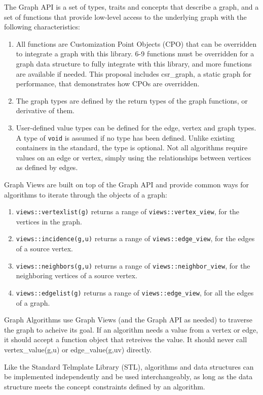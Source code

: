 \documentclass[10pt,onecolumn]{article}
\begin{document}
The Graph API is a set of types, traits and concepts that describe a graph, and a set of functions that provide low-level access to the 
underlying graph with the following characteristics:
\begin{enumerate}
\item All functions are Customization Point Objects (CPO) that can be overridden to integrate a graph with this library. 
6-9 functions must be overridden for a graph data structure to fully integrate with this library, and more functions are available if needed. This proposal includes 
csr\_graph, a static graph for performance, that demonstrates how CPOs are overridden.
\item The graph types are defined by the return types of the graph functions, or derivative of them.
\item User-defined value types can be defined for the edge, vertex and graph types. A type of \texttt{void} is assumed if no type has been defined.
Unlike existing containers in the standard, the type is optional. Not all algorithms require values on an edge or vertex, simply using the relationships
between vertices as defined by edges.
\end{enumerate}

Graph Views are built on top of the Graph API and provide common ways for algorithms to iterate through the objects of a graph:
\begin{enumerate}
\item \texttt{views::vertexlist(g)} returns a range of \texttt{views::vertex\_view}, for the vertices in the graph. 
\item \texttt{views::incidence(g,u)} returns a range of \texttt{views::edge\_view}, for the edges of a source vertex.
\item \texttt{views::neighbors(g,u)} returns a range of \texttt{views::neighbor\_view}, for the neighboring vertices of a source vertex.
\item \texttt{views::edgelist(g)} returns a range of \texttt{views::edge\_view}, for all the edges of a graph. 
\end{enumerate}

Graph Algorithms use Graph Views (and the Graph API as needed) to traverse the graph to acheive its goal. If an algorithm needs a value from 
a vertex or edge, it should accept a function object that retreives the value. It should never call vertex\_value(g,u) or edge\_value(g,uv)
directly.

Like the Standard Telmplate Library (STL), algorithms and data structures can be implemented independently and be used interchangeably,
as long as the data structure meets the concept constraints defined by an algorithm.
\end{document}
